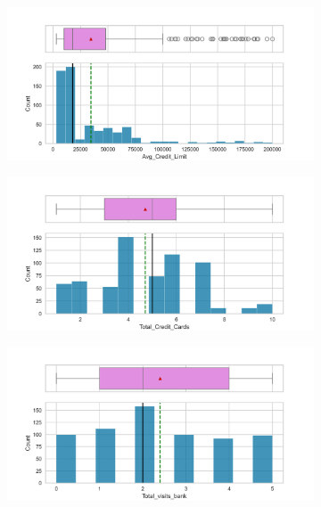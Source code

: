 \documentclass[10pt,a4paper]{style}
\begin{document}
		\begin{figure}[h]
		\centering
		\begin{subfigure}[t]{0.49\textwidth}
			\includegraphics[width=\textwidth]{box_Avg_Credit_Limit.png}
			\caption{}
			\label{fig:box_Avg_Credit_Limit}
		\end{subfigure}
		\hfill
		\begin{subfigure}[t]{0.49\textwidth}
			\includegraphics[width=\textwidth]{box_Total_Credit_Cards.png}
			\caption{}
			\label{fig:box_Total_Credit_Cards}
		\end{subfigure}
		\begin{subfigure}[t]{0.49\textwidth}
			\includegraphics[width=\textwidth]{box_Total_visits_bank.png}

\end{subfigure}
\end{figure}
\end{document}
